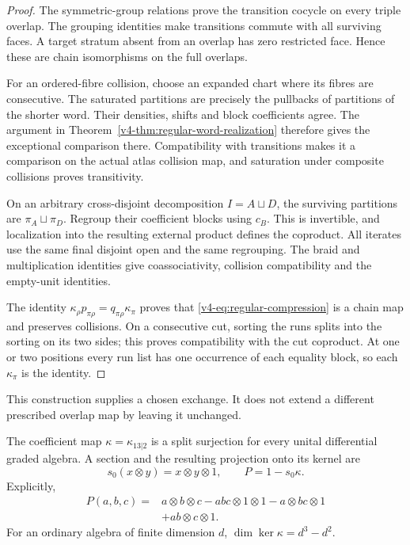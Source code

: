 \begin{proof}
The symmetric-group relations prove the transition
cocycle on every triple overlap. The grouping
identities make transitions commute with all
surviving faces. A target stratum absent from an
overlap has zero restricted face. Hence these are
chain isomorphisms on the full overlaps.

For an ordered-fibre collision, choose an expanded
chart where its fibres are consecutive. The saturated
partitions are precisely the pullbacks of partitions
of the shorter word. Their densities, shifts and
block coefficients agree. The argument in
Theorem~\ref{v4-thm:regular-word-realization} therefore
gives the exceptional comparison there. Compatibility
with transitions makes it a comparison on the actual
atlas collision map, and saturation under composite
collisions proves transitivity.

On an arbitrary cross-disjoint decomposition
\(I=A\sqcup D\), the surviving partitions are
\(\pi_A\sqcup\pi_D\). Regroup their coefficient
blocks using \(c_B\). This is invertible, and
localization into the resulting external product
defines the coproduct. All iterates use the same
final disjoint open and the same regrouping.
The braid and multiplication identities give
coassociativity, collision compatibility and the
empty-unit identities.

The identity
\(\kappa_\rho p_{\pi\rho}=q_{\pi\rho}\kappa_\pi\)
proves that \eqref{v4-eq:regular-compression} is
a chain map and preserves collisions.
On a consecutive cut, sorting the runs splits
into the sorting on its two sides; this proves
compatibility with the cut coproduct.
At one or two positions every run list has
one occurrence of each equality block, so
each \(\kappa_\pi\) is the identity.
\end{proof}

This construction supplies a chosen exchange.
It does not extend a different prescribed overlap
map by leaving it unchanged.

\begin{proposition}
\label{v4-prop:regular-compression-kernel}
The coefficient map \(\kappa=\kappa_{13|2}\) is
a split surjection for every unital differential
graded algebra. A section and the resulting
projection onto its kernel are
\[
 s_0(x\otimes y)=x\otimes y\otimes1,
 \qquad P=1-s_0\kappa.
\]
Explicitly,
\[
 \begin{split}
 P(a,b,c)={}&a\otimes b\otimes c
      -abc\otimes1\otimes1-a\otimes bc\otimes1\\
      &+ab\otimes c\otimes1.
 \end{split}
\]
For an ordinary algebra of finite dimension \(d\),
\(\dim\ker\kappa=d^3-d^2\).
\end{proposition}

